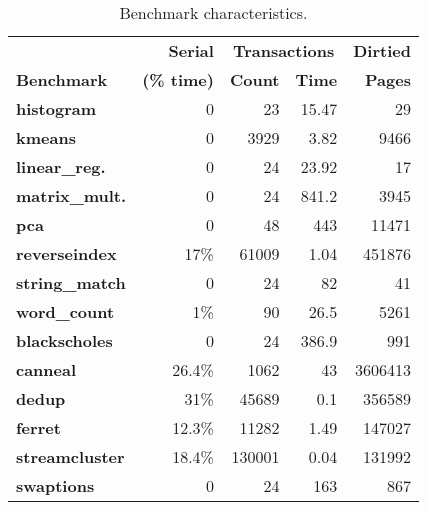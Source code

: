 \begin{table}[!t]
\centering
\begin{tabular}{l|rrrr}
&
{\bf \small Serial} &
\multicolumn{2}{c}{\bf \small Transactions} &
{\bf \small Dirtied}
\\
{\bf \small Benchmark} &
{\bf \small (\% time)} &
{\bf \small Count} &
{\bf \small Time} &
{\bf \small Pages}\\
\hline
\small \textbf{histogram} & \small 0 & \small 23 & \small 15.47 & \small 29\\
\small \textbf{kmeans} & \small 0 & \small 3929 & \small 3.82 & \small 9466\\
\small \textbf{linear\_reg.} & \small 0 & \small 24 & \small 23.92 & \small 17\\
\small \textbf{matrix\_mult.} & \small 0 & \small 24 & \small 841.2 & \small 3945\\
\small \textbf{pca} & \small 0 & \small 48 & \small 443 & \small 11471\\
\small \textbf{reverseindex} & \small 17\% & \small 61009 & \small 1.04 & \small 451876\\
\small \textbf{string\_match} & \small 0 & \small 24 & \small 82 & \small 41\\
\small \textbf{word\_count} & \small 1\% & \small 90 & \small 26.5 & \small 5261\\
\small \textbf{blackscholes} & \small 0 & \small 24 & \small 386.9 & \small 991\\
\small \textbf{canneal} & \small 26.4\% & \small 1062 & \small 43 & \small 3606413\\
\small \textbf{dedup} & \small 31\% & \small 45689 & \small 0.1 & \small 356589\\
\small \textbf{ferret} & \small 12.3\% & \small 11282 & \small 1.49 & \small 147027 \\
\small \textbf{streamcluster} & \small 18.4\% & \small 130001 & \small 0.04 & \small 131992\\
\small \textbf{swaptions} & \small 0 & \small 24 & \small 163 & \small 867\\
\hline
\end{tabular}
\caption{Benchmark characteristics.\label{tbl:characteristics}}
\end{table}
